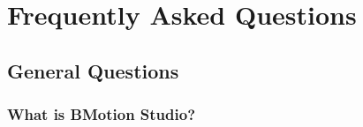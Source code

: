\chapter{Frequently Asked Questions}
\label{faq}

\section{General Questions}

\subsection{What is BMotion Studio?}
